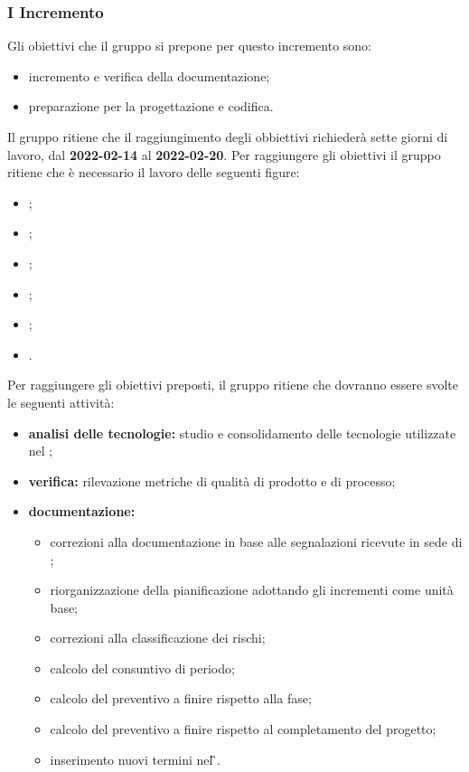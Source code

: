 \subsubsection{I Incremento}
Gli obiettivi che il gruppo si prepone per questo incremento sono:
\begin{itemize}
	\item incremento e verifica della documentazione;
	\item preparazione per la progettazione e codifica.
\end{itemize}
Il gruppo ritiene che il raggiungimento degli obbiettivi richiederà sette giorni di lavoro, dal \textbf{2022-02-14} al \textbf{2022-02-20}.
Per raggiungere gli obiettivi il gruppo ritiene che è necessario il lavoro delle seguenti figure:
\begin{itemize}
	\item \RE{};
 	\item \AM{};
  	\item \AN{};
   	\item \PR{};
   	\item \PT{};
   	\item \VE{}.
\end{itemize}
Per raggiungere gli obiettivi preposti, il gruppo ritiene che dovranno essere svolte le seguenti attività:
\begin{itemize}
	\item \textbf{analisi delle tecnologie:} studio e consolidamento delle tecnologie utilizzate nel \PoC{};
 	\item \textbf{verifica:} rilevazione metriche di qualità di prodotto e di processo;
	 \item \textbf{documentazione:} 
	 \begin{itemize}
		 \item correzioni alla documentazione in base alle segnalazioni ricevute in sede di \RTB{};
		   \item riorganizzazione della pianificazione adottando gli incrementi come
		   unità base;
		  \item correzioni alla classificazione dei rischi;
		   \item calcolo del consuntivo di periodo;
		  \item calcolo del preventivo a finire rispetto alla fase;
			\item calcolo del preventivo a finire rispetto al completamento del progetto;  
		   \item inserimento nuovi termini nel \G{}.
	 \end{itemize}
\end{itemize}
